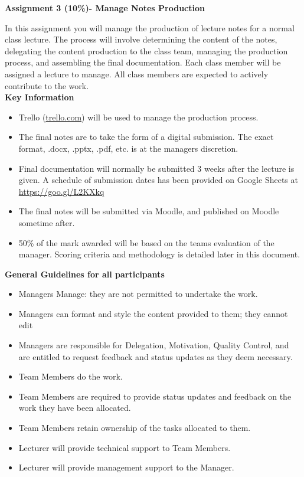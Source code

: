 
	
\begin{flushleft}
\Large\textbf{Assignment 3 (10\%)- Manage Notes Production}\\
\end{flushleft}

In this assignment you will manage the production of lecture notes for a normal class lecture.  The process will involve determining the content of the notes, delegating the content production to the class team, managing the production process, and assembling the final documentation.  Each class member will be assigned a lecture to manage.  All class members are expected to actively contribute to the work.\\

\textbf{Key Information}\\

\begin{itemize}
	\item Trello (\href{trello.com}{trello.com}) will be used to manage the production process.
	\item The final notes are to take the form of a digital submission.  The exact format, .docx, .pptx, .pdf, etc. is at the managers discretion. 
	\item Final documentation will normally be submitted 3 weeks after the lecture is given.  A schedule of submission dates has been provided on Google Sheets at \href{https://goo.gl/L2KXkq}{https://goo.gl/L2KXkq}
	\item The final notes will be submitted via Moodle, and published on Moodle sometime after.
	\item 50\% of the mark awarded will be based on the teams evaluation of the manager.  Scoring criteria and methodology is detailed later in this document.
\end{itemize}

\textbf{General Guidelines for all participants}\\

\begin{itemize}
	\item Managers Manage: they are not permitted to undertake the work.
	\item Managers can format and style the content provided to them; they cannot edit
	\item Managers are responsible for Delegation, Motivation, Quality Control, and are entitled to request feedback and status updates as they deem necessary.
	\item Team Members do the work.
	\item Team Members are required to provide status updates and feedback on the work they have been allocated.
	\item Team Members retain ownership of the tasks allocated to them. 
	\item Lecturer will provide technical support to Team Members.
	\item Lecturer will provide management support to the Manager.
\end{itemize}

